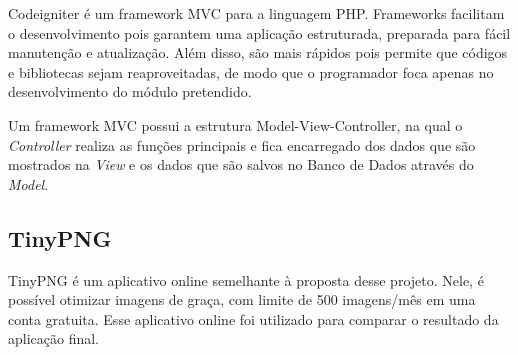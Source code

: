 Codeigniter é um framework MVC para a linguagem PHP. Frameworks facilitam o desenvolvimento pois garantem uma aplicação estruturada, preparada para fácil manutenção e atualização. Além disso, são mais rápidos pois permite que códigos e bibliotecas sejam reaproveitadas, de modo que o programador foca apenas no desenvolvimento do módulo pretendido.

Um framework MVC possui a estrutura Model-View-Controller, na qual o {\em Controller} realiza as funções principais e fica encarregado dos dados que são mostrados na {\em View} e os dados que são salvos no Banco de Dados através do {\em Model}.

\subsection{TinyPNG}
\label{s.github}

TinyPNG é um aplicativo online semelhante à proposta desse projeto. Nele, é possível otimizar imagens de graça, com limite de 500 imagens/mês em uma conta gratuita. Esse aplicativo online foi utilizado para comparar o resultado da aplicação final.

%
